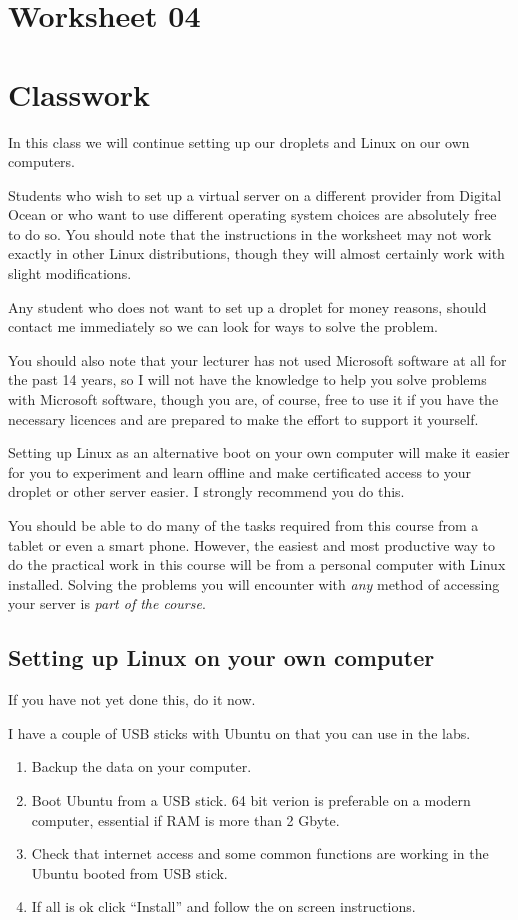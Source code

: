 \documentclass[12pt, a4paper]{article}
\begin{document}
\section*{Worksheet 04}
\section*{Classwork}
In this class we will continue setting up our droplets and Linux on our own 
computers.

Students who wish to set up a virtual server on a different provider from 
Digital Ocean or who want to use different operating system choices are 
absolutely free to do so. You should note that the instructions in the worksheet may not work exactly in other Linux distributions, though they will almost certainly work with slight modifications.

Any student who does not want to set up a droplet for money reasons, should contact me immediately so we can look for ways to solve the problem. 

You should also note that your lecturer has not used Microsoft software at all for the past 14 years, so I will not have the knowledge to help you solve problems with Microsoft software, though you are, of course, free to use it if you have the necessary licences and are prepared to make the effort to support it yourself. 

Setting up Linux as an alternative boot on your own computer will make it easier for you to experiment and learn offline and make certificated access to your droplet or other server easier. I strongly recommend you do this.

You should be able to do many of the tasks required from this course from a tablet or even a smart phone. However, the easiest and most productive way to do the practical work in this course will be from a personal computer with Linux installed. Solving the problems you will encounter with \emph{any} method of accessing your server is \emph{part of the course}.

\subsection*{Setting up Linux on your own computer}

If you have not yet done this, do it now. 

I have a couple of USB sticks with Ubuntu on that you can use in the labs.


\begin{enumerate}
 \item Backup the data on your computer.
 \item Boot Ubuntu from a USB stick. 64 bit verion is preferable on a modern computer, 
  essential if RAM is more than 2 Gbyte.
 \item Check that internet access and some common functions are working in the Ubuntu booted from USB stick.
 \item If all is ok click ``Install'' and follow the on screen instructions.
\end{enumerate}
\end{document}
